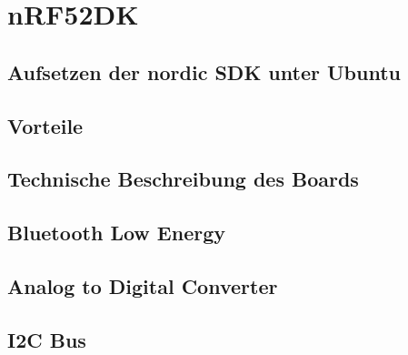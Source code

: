 \chapter{nRF52DK}
\label{chap:nrf52dk}

\section{Aufsetzen der nordic SDK unter Ubuntu}
\section{Vorteile}
\section{Technische Beschreibung des Boards}
\section{Bluetooth Low Energy}
\section{Analog to Digital Converter}
\section{I2C Bus}